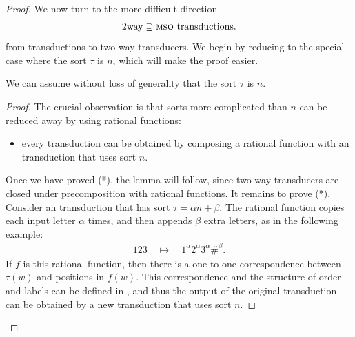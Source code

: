 \begin{proof}
    We now turn to the more difficult direction
    \begin{align*}
    \mathrm{2way} \supseteq {\textsc{mso}} \text{ transductions}.
    \end{align*} from \mso transductions to two-way transducers. We begin by reducing to the special case where the sort $\tau$ is $n$, which will make the proof easier. 
    \begin{lemma}\label{lem:logic-reduction-to-type-n}
        We can assume without loss of generality that the sort $\tau$ is $n$.
    \end{lemma}
    \begin{proof}
        The crucial observation is that sorts more complicated than $n$ can be reduced away by using rational functions:
        \begin{itemize}
            \item[(*)] every \mso transduction can be obtained by composing a rational function with an \mso transduction that uses sort $n$.
        \end{itemize}
        Once we have proved (*), the lemma will follow, since two-way transducers are closed under precomposition with rational functions. It remains to prove (*). Consider an \mso transduction that has  sort $\tau = \alpha n + \beta$. The rational function copies each input letter $\alpha$ times, and then appends $\beta$ extra letters, as in the following example:
\begin{align*}
123 \quad \mapsto \quad 1^\alpha 2^\alpha 3^\alpha \#^\beta.
\end{align*}
If $f$ is this rational function, then there is a one-to-one correspondence between $\tau(w)$ and positions in $f(w)$. This correspondence and the structure of order and labels can be defined in \mso, and thus the output of the original \mso transduction can be obtained by a new \mso transduction that uses sort $n$.
    \end{proof}


\end{proof}
